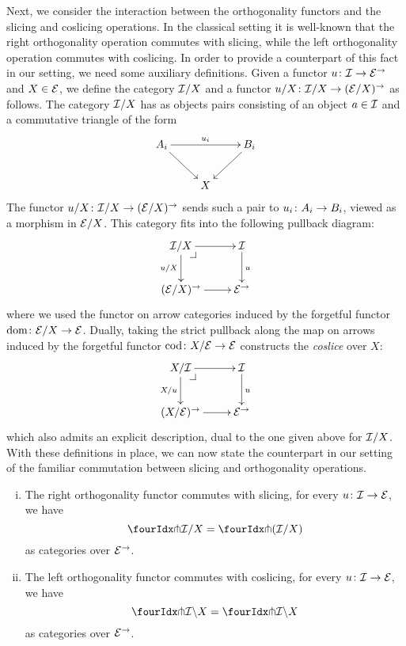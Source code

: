 \documentclass[reqno,10pt,a4paper,oneside]{amsart}
\begin{document}
Next, we consider the interaction between the orthogonality functors and the slicing and coslicing operations. 
 In the classical setting it is well-known that the right orthogonality operation commutes with slicing, while the left orthogonality operation commutes with coslicing.  In order to provide a counterpart of this fact in our setting, we need some auxiliary definitions. Given a functor $u \co \cal{I} \to \catE^{\to}$ and $X \in \catE$, we define the category $\cal{I}/X$
and a functor $u/X \co \cal{I}/X \to (\cal{E}/X)^\to$ as follows. The category $\cal{I}/X$ has as objects pairs consisting of an object $a \in \cal{I}$ and a commutative triangle of the form
\[
\xymatrix{
A_i \ar[dr] \ar[rr]^{u_i} & & B_i \ar[dl] \\
 & X }
 \]
The functor $u/X \co \cal{I}/X \to (\cal{E}/X)^\to$ sends such a pair to $u_i \co A_i \to B_i$, viewed as a morphism in $\cal{E}/X$. This category fits into the
following pullback diagram:
\[
\xymatrix{
  \cal{I}/X
  \ar[r]
  \ar[d]_{u/X}
  \pullback{dr}
&
  \cal{I}
  \ar[d]^{u}
\\
  (\catE/X)^{\to}
  \ar[r]
&
  \catE^{\to}
}
\]
where we used the functor on arrow categories induced by the forgetful functor $\operatorname{dom} \co \catE/X \to \catE$.  Dually, taking the strict pullback along the map on arrows induced by the forgetful functor 
$\operatorname{cod} \co X/\cal{E} \to \catE$ constructs the \emph{coslice} over $X$:
\[
\xymatrix{
  X/\cal{I}
  \ar[r]
  \ar[d]_{X/u}
  \pullback{dr}
&
  \cal{I}
  \ar[d]^{u}
\\
  (X/\catE)^{\to}
  \ar[r]
&
  \catE^{\to}
}
\]
which also admits an explicit description, dual to the one given above for $\cal{I}/X$. With these definitions in place, we can now state the counterpart in our setting of the familiar commutation between slicing and orthogonality operations. 



\begin{proposition} \hfill 
\label{pitchfork-slicing}
\begin{enumerate}[(i)]
\item The right orthogonality functor commutes with slicing, \ie for every $u \co \cal{I} \to \cal{E}$, we have
\[
  \liftr{\cal{I}}/X = \liftr{(\cal{I}/X)}
\]
as categories over $\cal{E}^\to$.
\item The left orthogonality functor commutes with coslicing, \ie for every $u \co \cal{I} \to \cal{E}$, we have
\[
 \liftl{\cal{I}} \backslash X = \liftl{\cal{I} \backslash X}
\]
as categories over $\cal{E}^\to$.
\end{enumerate}
\end{proposition}
\end{document}
